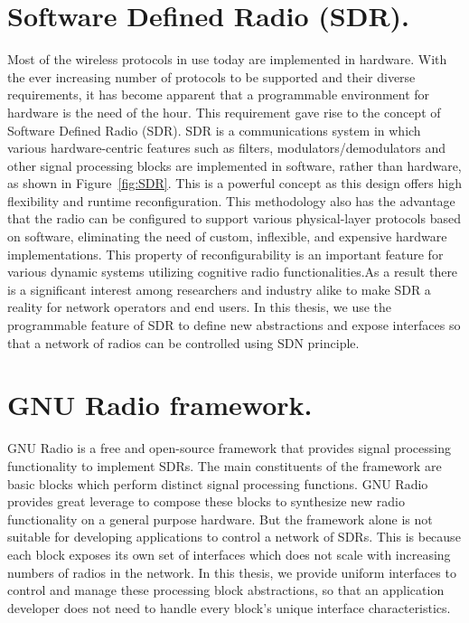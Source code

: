 \section{Software Defined Radio (SDR).}
Most of the wireless protocols in use today are implemented in hardware. With the ever increasing number of protocols to be supported and their diverse requirements, it has become apparent that a programmable environment for hardware is the need of the hour. This requirement gave rise to the concept of Software Defined Radio (SDR). SDR is a communications system in which various hardware-centric features such as filters, modulators/demodulators and other signal processing blocks are implemented in software, rather than hardware, as shown in Figure~\ref{fig:SDR}. This is a powerful concept as this design offers high flexibility and runtime reconfiguration. This methodology also has the advantage that the radio can be configured to support various physical-layer protocols based on software, eliminating the need of custom, inflexible, and expensive hardware implementations. This property of reconfigurability is an important feature for various dynamic systems utilizing cognitive radio functionalities.As a result there is a significant interest among researchers and industry alike to make SDR a reality for network operators and end users. In this thesis, we use the programmable feature of SDR to define new abstractions and expose interfaces so that a network of radios can be controlled using SDN principle. 

\section{GNU Radio framework.}
GNU Radio \cite{gnuradio} is a free and open-source framework that provides signal processing functionality to implement SDRs. The main constituents of the framework are basic blocks which perform distinct signal processing functions. GNU Radio provides great leverage to compose these blocks to synthesize new radio functionality on a general purpose hardware. But the framework alone is not suitable for developing applications to control a network of SDRs. This is because each block exposes its own set of interfaces which does not scale with increasing numbers of radios in the network. In this thesis, we provide uniform interfaces to control and manage these processing block abstractions, so that an application developer does not need to handle every block's unique interface characteristics.

